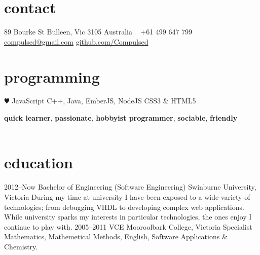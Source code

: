 \documentclass[]{friggeri-cv} %
\begin{document}

\begin{aside} %
\section{contact}
89 Bourke St
Bulleen, Vic 3105
Australia
~
+61 499 647 799
~
\href{mailto:compulsed@gmail.com}{compulsed@gmail.com}
\href{http://www.github.com/Compulsed/}{github.com/Compulsed}
\section{programming}
{\color{red} $\varheartsuit$} JavaScript
C++, Java, EmberJS, NodeJS
CSS3 \& HTML5
\end{aside}


\textbf{quick learner}, \textbf{passionate}, \textbf{hobbyist programmer}, \textbf{sociable}, \textbf{friendly} \\ \\




\section{education}

\begin{entrylist}
\entry
{2012--Now}
{Bachelor {\normalfont of Engineering (Software Engineering)}}
{Swinburne University, Victoria}
{During my time at university I have been exposed to a wide variety of technologies; from debugging VHDL to developing complex web applications. While university sparks my interests in particular technologies, the ones enjoy I continue to play with. }
\entry
{2005--2011}
{VCE {\normalfont}}
{Mooroolbark College, Victoria}
{Specialist Mathematics, Mathemetical Methods, English, Software Applications \& Chemistry.}
\end{entrylist}
\end{document}
